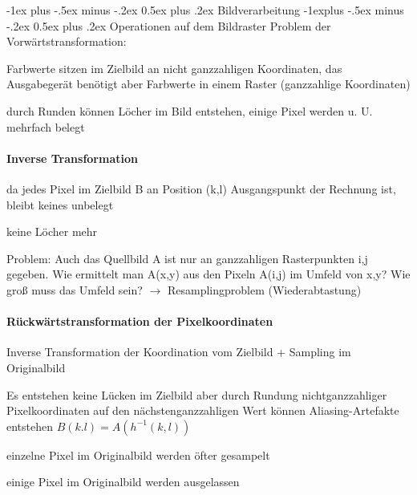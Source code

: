 \documentclass[landscape]{article}
\makeatletter
\renewcommand{\section}{\@startsection{section}{1}{0mm}%
                                {-1ex plus -.5ex minus -.2ex}%
                                {0.5ex plus .2ex}%
                                {\normalfont\large\bfseries}}
\renewcommand{\subsection}{\@startsection{subsection}{2}{0mm}%
                                {-1explus -.5ex minus -.2ex}%
                                {0.5ex plus .2ex}%
                                {\normalfont\normalsize\bfseries}}
\makeatother
\begin{document}
\begin{multicols}{3}
  \section{Bildverarbeitung}
  \subsection{Operationen auf dem Bildraster}
  Problem der Vorwärtstransformation:
  \begin{itemize*}
    \item Farbwerte sitzen im Zielbild an nicht ganzzahligen Koordinaten, das Ausgabegerät benötigt aber Farbwerte in einem Raster (ganzzahlige Koordinaten)
    \item durch Runden können Löcher im Bild entstehen, einige Pixel werden u. U. mehrfach belegt
  \end{itemize*}
  
  \paragraph{Inverse Transformation}
  \begin{itemize*}
    \item da jedes Pixel im Zielbild B an Position (k,l) Ausgangspunkt der Rechnung ist, bleibt keines unbelegt
    \item keine Löcher mehr
    \item Problem: Auch das Quellbild A ist nur an ganzzahligen Rasterpunkten i,j gegeben. Wie ermittelt man A(x,y) aus den Pixeln A(i,j) im Umfeld von x,y? Wie groß muss das Umfeld sein? $\rightarrow$ Resamplingproblem (Wiederabtastung)
  \end{itemize*}
  
  \paragraph{Rückwärtstransformation der Pixelkoordinaten}
  \begin{itemize*}
    \item Inverse Transformation der Koordination vom Zielbild + Sampling im Originalbild
    \item Es entstehen keine Lücken im Zielbild aber durch Rundung nichtganzzahliger Pixelkoordinaten auf den nächstenganzzahligen Wert können Aliasing-Artefakte entstehen $B(k.l)=A(h^{-1}(k,l))$
    \begin{itemize*}
      \item einzelne Pixel im Originalbild werden öfter gesampelt
      \item einige Pixel im Originalbild werden ausgelassen
    \end{itemize*}
  \end{itemize*}
  

\end{multicols}
\end{document}
